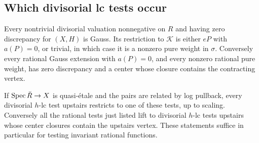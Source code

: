 \subsection{Which divisorial lc tests occur}

\begin{lemma}\label{lem:D-lc-tests}
Every nontrivial divisorial valuation nonnegative on $R$ and having
zero discrepancy for $(X,H)$ is Gauss.  Its restriction to $\mathcal K$
is either $eP$ with $a(P)=0$, or trivial, in which case it is a nonzero
pure weight in $\sigma$.  Conversely every rational Gauss extension
with $a(P)=0$, and every nonzero rational pure weight, has zero
discrepancy and a center whose closure contains the contracting vertex.

If $\operatorname{Spec}\breve R\to X$ is quasi-\'{e}tale and the pairs are related by
log pullback, every divisorial $h$-lc test upstairs restricts to one of
these tests, up to scaling.  Conversely all the rational tests just
listed lift to divisorial $h$-lc tests upstairs whose center closures
contain the upstairs vertex.  These statements suffice in particular
for testing invariant rational functions.
\end{lemma}

